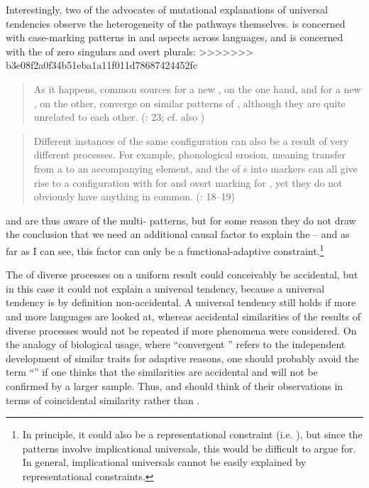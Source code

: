 \documentclass[output=paper]{langsci/langscibook}
\begin{document}
Interestingly, two of the advocates of mutational explanations of universal tendencies observe the heterogeneity of the pathways themselves. \citet{Anderson2016} is concerned with case-marking patterns in  and  aspects across languages, and \citet{Cristofaro2017} is concerned with the  of zero singulars and overt plurals:
>>>>>>> b3e08f2a0f34b51eba1a11f011d78687424452fc

\begin{quote}
As it happens, common sources for a new , on the one hand, and for a new , on the other, converge on similar patterns of , although they are quite unrelated to each other. (\citealt{Anderson2016}: 23; cf. also \citealt{Anderson1977})
\end{quote}

\begin{quote}
Different instances of the same configuration can also be a result of very different processes. For example, phonological erosion, meaning transfer from a  to an accompanying element, and the  of s into  markers can all give rise to a configuration with  for  and overt marking for , yet they do not obviously have anything in common. (\citealt{Cristofaro2017}: 18–19)
\end{quote}

\noindent {} and  are thus aware of the multi- patterns, but for some reason they do not draw the conclusion that we need an additional causal factor to explain the  – and as far as I can see, this factor can only be a functional-adaptive constraint.\footnote{In principle, it could also be a representational constraint (i.e. ), but since the patterns involve implicational universals, this would be difficult to argue for. In general, implicational universals cannot be easily explained by representational constraints.}

The  of diverse processes on a uniform result could conceivably be accidental, but in this case it could not explain a universal tendency, because a universal tendency is by definition non-accidental. A universal tendency still holds if more and more languages are looked at, whereas accidental similarities of the results of diverse processes would not be repeated if more phenomena were considered. On the analogy of biological usage, where “convergent ” refers to the independent development of similar traits for adaptive reasons, one should probably avoid the term “” if one thinks that the similarities are accidental and will not be confirmed by a larger sample. Thus,  and  should think of their observations in terms of coincidental similarity rather than .
\end{document}
